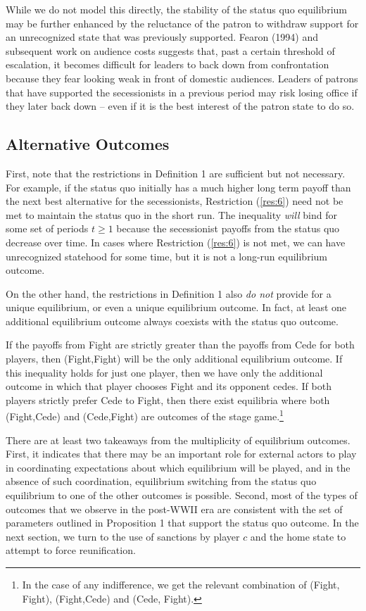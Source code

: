 \documentclass[11pt,letterpaper, notitlepage]{article}
\begin{document}
While we do not model this directly, the stability of the status quo equilibrium may be further enhanced by the reluctance of the patron to withdraw support for an unrecognized state that was previously supported. Fearon (1994) and subsequent work on audience costs suggests that, past a certain threshold of escalation, it becomes difficult for leaders to back down from confrontation because they fear looking weak in front of domestic audiences. Leaders of patrons that have supported the secessionists in a previous period may risk losing office if they later back down -- even if it is the best interest of the patron state to do so.  

\subsection{Alternative Outcomes}
\label{sec:alt}

First, note that the restrictions in Definition 1 are sufficient but not necessary. For example, if the status quo initially has a much higher long term payoff than the next best alternative for the secessionists, Restriction (\ref{res:6}) need not be met to maintain the status quo in the short run. The inequality \emph{will} bind for some set of periods $t \geq 1$ because the secessionist payoffs from the status quo decrease over time. In cases where Restriction (\ref{res:6}) is not met, we can have unrecognized statehood for some time, but it is not a long-run equilibrium outcome.

On the other hand, the restrictions in Definition 1 also \emph{do not} provide for a unique equilibrium, or even a unique equilibrium outcome. In fact, at least one additional equilibrium outcome always coexists with the status quo outcome.

If the payoffs from Fight are strictly greater than the payoffs from Cede for both players, then (Fight,Fight) will be the only additional equilibrium outcome. If this inequality holds for just one player, then we have only the additional outcome in which that player chooses Fight and its opponent cedes. If both players strictly prefer Cede to Fight, then there exist equilibria where both (Fight,Cede) and (Cede,Fight) are outcomes of the stage game.\footnote{In the case of any indifference, we get the relevant combination of (Fight, Fight), (Fight,Cede) and (Cede, Fight).}

There are at least two takeaways from the multiplicity of equilibrium outcomes. First, it indicates that there may be an important role for external actors to play in coordinating expectations about which equilibrium will be played, and in the absence of such coordination, equilibrium switching from the status quo equilibrium to one of the other outcomes is possible. Second, most of the types of outcomes that we observe in the post-WWII era are consistent with the set of parameters outlined in Proposition 1 that support the status quo outcome. In the next section, we turn to the use of sanctions by player $c$ and the home state to attempt to force reunification.
\end{document}
